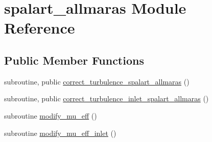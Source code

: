 \hypertarget{classspalart__allmaras}{\section{spalart\-\_\-allmaras Module Reference}
\label{classspalart__allmaras}
}
\subsection*{Public Member Functions}
\begin{DoxyCompactItemize}
\item 
subroutine, public \hyperlink{classspalart__allmaras_a60efb0f127370a55bbf0178d68f30683}{correct\-\_\-turbulence\-\_\-spalart\-\_\-allmaras} ()
\item 
subroutine, public \hyperlink{classspalart__allmaras_a2ffe9e1ca257402ec463076fa2318a21}{correct\-\_\-turbulence\-\_\-inlet\-\_\-spalart\-\_\-allmaras} ()
\item 
subroutine \hyperlink{classspalart__allmaras_abdda34975676efe56f48973b6232a3b3}{modify\-\_\-mu\-\_\-eff} ()
\item 
subroutine \hyperlink{classspalart__allmaras_a39fb7d437ed286f6c825ef0533461cea}{modify\-\_\-mu\-\_\-eff\-\_\-inlet} ()
\end{DoxyCompactItemize}

